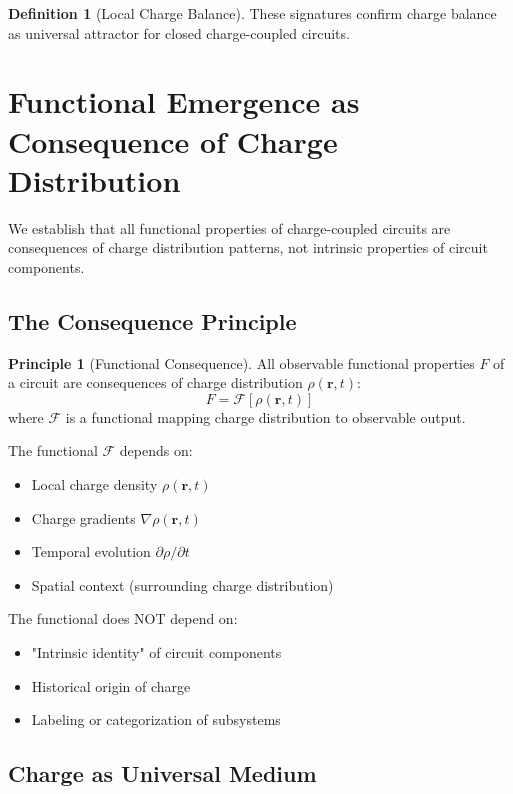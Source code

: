 \documentclass[12pt,a4paper]{article}
\theoremstyle{plain}
\theoremstyle{definition}
\newtheorem{definition}[theorem]{Definition}
\newtheorem{principle}[theorem]{Principle}
\theoremstyle{remark}
\begin{document}
\begin{definition}[Local Charge Balance]
These signatures confirm charge balance as universal attractor for closed charge-coupled circuits.
\section{Functional Emergence as Consequence of Charge Distribution}
\label{sec:functional_emergence}

We establish that all functional properties of charge-coupled circuits are consequences of charge distribution patterns, not intrinsic properties of circuit components.

\subsection{The Consequence Principle}

\begin{principle}[Functional Consequence]
\label{prin:functional_consequence}
All observable functional properties $F$ of a circuit are consequences of charge distribution $\rho(\mathbf{r},t)$:
\begin{equation}
F = \mathcal{F}[\rho(\mathbf{r},t)]
\end{equation}
where $\mathcal{F}$ is a functional mapping charge distribution to observable output.
\end{principle}

The functional $\mathcal{F}$ depends on:
\begin{itemize}
\item Local charge density $\rho(\mathbf{r},t)$
\item Charge gradients $\nabla \rho(\mathbf{r},t)$
\item Temporal evolution $\partial \rho / \partial t$
\item Spatial context (surrounding charge distribution)
\end{itemize}

The functional does NOT depend on:
\begin{itemize}
\item "Intrinsic identity" of circuit components
\item Historical origin of charge
\item Labeling or categorization of subsystems
\end{itemize}

\subsection{Charge as Universal Medium}


\end{definition}
\end{document}
